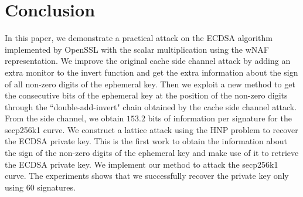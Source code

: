 \section{Conclusion}
\label{sec:conclusion}
In this paper, we demonstrate a practical attack on the ECDSA algorithm implemented by OpenSSL with the scalar multiplication using the wNAF representation.
We improve the original cache side channel attack by adding an extra monitor to the invert function and get the extra information about the sign of all non-zero digits of the ephemeral key.
Then we exploit a new method to get the consecutive bits of the ephemeral key at the position of the non-zero digits through the ``double-add-invert" chain obtained by the cache side channel attack.
From the side channel, we obtain $153.2$ bits of information per signature for the secp256k1 curve.
We construct a lattice attack using the HNP problem to recover the ECDSA private key.
This is the first work to obtain the information about the sign of the non-zero digits of the ephemeral key and make use of it to retrieve the ECDSA private key.
We implement our method to attack the secp256k1 curve.
The experiments shows that we successfully recover the private key only using $60$ signatures.






